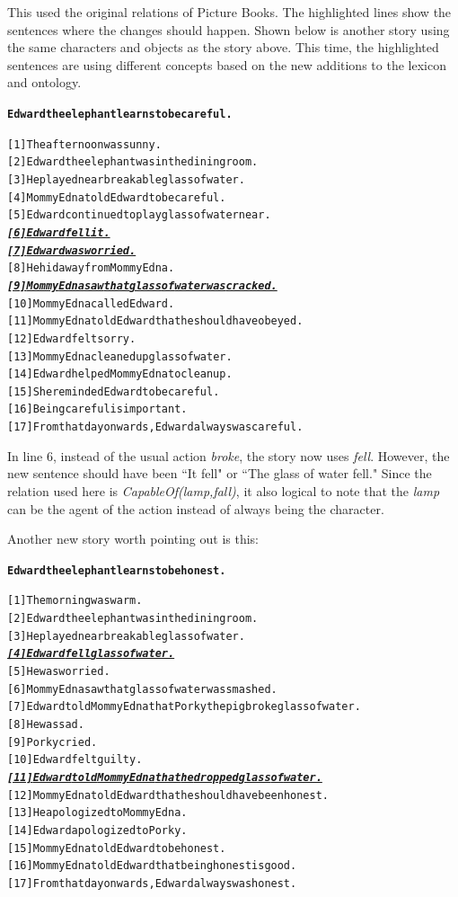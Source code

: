This used the original relations of Picture Books. The highlighted lines show the sentences where the changes should happen. Shown below is another story using the same characters and objects as the story above. This time, the highlighted sentences are using different concepts based on the new additions to the lexicon and ontology.

\begin{alltt}
\textbf{Edward the elephant learns to be careful.}

[1]  The afternoon was sunny.
[2]  Edward the elephant was in the dining room.
[3]  He played near breakable glass of water.
[4]  Mommy Edna told Edward to be careful.
[5]  Edward continued to play glass of water near.
\underline{\emph{\textbf{[6]  Edward fell it.}}}
\underline{\emph{\textbf{[7]  Edward was worried.}}}
[8]  He hid away from Mommy Edna.
\underline{\emph{\textbf{[9]  Mommy Edna saw that glass of water was cracked.}}}
[10] Mommy Edna called Edward.
[11] Mommy Edna told Edward that he should have obeyed.
[12] Edward felt sorry.
[13] Mommy Edna cleaned up glass of water.
[14] Edward helped Mommy Edna to clean up.
[15] She reminded Edward to be careful.
[16] Being careful is important.
[17] From that day onwards, Edward always was careful.
\end{alltt}

In line 6, instead of the usual action \textit{broke}, the story now uses \textit{fell}. However, the new sentence should have been ``It fell" or ``The glass of water fell." Since the relation used here is \textit{CapableOf(lamp,fall)}, it also logical to note that the \textit{lamp} can be the agent of the action instead of always being the character. 

Another new story worth pointing out is this:

\begin{alltt}
\textbf{Edward the elephant learns to be honest.}

[1]  The morning was warm.
[2]  Edward the elephant was in the dining room.
[3]  He played near breakable glass of water.
\underline{\emph{\textbf{[4]  Edward fell glass of water.}}}
[5]  He was worried.
[6]  Mommy Edna saw that glass of water was smashed.
[7]  Edward told Mommy Edna that Porky the pig broke glass of water.
[8]  He was sad.
[9]  Porky cried.
[10] Edward felt guilty.
\underline{\emph{\textbf{[11] Edward told Mommy Edna that he dropped glass of water.}}}
[12] Mommy Edna told Edward that he should have been honest.
[13] He apologized to Mommy Edna.
[14] Edward apologized to Porky.
[15] Mommy Edna told Edward to be honest.
[16] Mommy Edna told Edward that being honest is good.
[17] From that day onwards, Edward always was honest.
\end{alltt}

